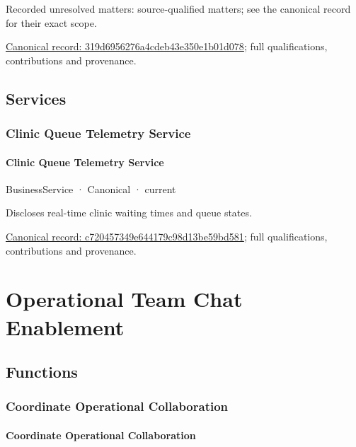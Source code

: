 {\small Recorded unresolved matters: source-qualified matters; see the canonical record for their exact scope.}\par
{\footnotesize \href{../../../../continuum/business/business-process/319d6956276a4cdeb43e350e1b01d078.md}{Canonical record: 319d6956276a4cdeb43e350e1b01d078}; full qualifications, contributions and provenance.}\par
\subsection{Services}

\subsubsection{Clinic Queue Telemetry Service}

\paragraph{Clinic Queue Telemetry Service}

\label{element:c720457349e644179c98d13be59bd581}
{\small BusinessService · Canonical · current}\par

Discloses real-time clinic waiting times and queue states.


{\footnotesize \href{../../../../continuum/business/business-service/c720457349e644179c98d13be59bd581.md}{Canonical record: c720457349e644179c98d13be59bd581}; full qualifications, contributions and provenance.}\par
\section{Operational Team Chat Enablement}

\subsection{Functions}

\subsubsection{Coordinate Operational Collaboration}

\paragraph{Coordinate Operational Collaboration}

